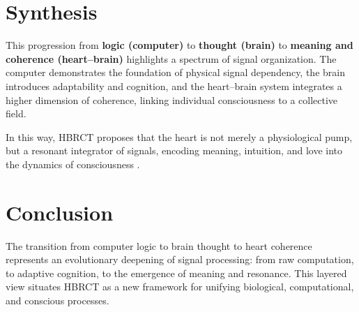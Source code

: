 \documentclass[12pt]{article}
\begin{document}
\begin{center}
\end{center}


\section*{Synthesis}
This progression from \textbf{logic (computer)} to \textbf{thought (brain)} to \textbf{meaning and coherence (heart--brain)} 
highlights a spectrum of signal organization. 
The computer demonstrates the foundation of physical signal dependency, 
the brain introduces adaptability and cognition, 
and the heart--brain system integrates a higher dimension of coherence, 
linking individual consciousness to a collective field. 

In this way, HBRCT proposes that the heart is not merely a physiological pump, 
but a resonant integrator of signals, encoding meaning, intuition, and love into the dynamics of consciousness 
\citep{mcCraty2015science, childre2016heartintelligence}.


\section*{Conclusion}
The transition from computer logic to brain thought to heart coherence represents an evolutionary 
deepening of signal processing: from raw computation, to adaptive cognition, to the emergence of 
meaning and resonance. This layered view situates HBRCT as a new framework for unifying 
biological, computational, and conscious processes.


\nocite{*}


\end{document}
